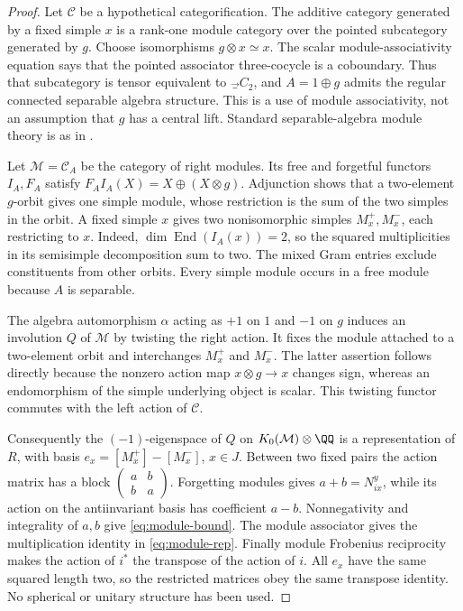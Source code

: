 \begin{proof}
Let $\mathcal C$ be a hypothetical categorification. The additive category
generated by a fixed simple $x$ is a rank-one module category over the
pointed subcategory generated by $g$. Choose isomorphisms $g\otimes x\simeq x$.
The scalar module-associativity equation says that the pointed associator
three-cocycle is a coboundary. Thus that subcategory is tensor equivalent
to $\Vec_{C_2}$, and $A=1\oplus g$ admits the regular connected separable
algebra structure. This is a use of module associativity, not an assumption
that $g$ has a central lift. Standard separable-algebra module theory is
as in \cite[Chapter~7]{EGNO}.

Let $\mathcal M=\mathcal C_A$ be the category of right modules. Its free
and forgetful functors $I_A,F_A$ satisfy
$F_AI_A(X)=X\oplus(X\otimes g)$. Adjunction shows that a two-element
$g$-orbit gives one simple module, whose restriction is the sum of the two
simples in the orbit. A fixed simple $x$ gives two nonisomorphic simples
$M_x^+,M_x^-$, each restricting to $x$. Indeed,
$\dim\operatorname{End}(I_A(x))=2$, so the squared multiplicities in its
semisimple decomposition sum to two. The mixed Gram entries exclude
constituents from other orbits. Every simple module occurs in a free
module because $A$ is separable.

The algebra automorphism $\alpha$ acting as $+1$ on $1$ and $-1$ on $g$
induces an involution $Q$ of $\mathcal M$ by twisting the right action.
It fixes the module attached to a two-element orbit and interchanges
$M_x^+$ and $M_x^-$. The latter assertion follows directly because the
nonzero action map $x\otimes g\to x$ changes sign, whereas an
endomorphism of the simple underlying object is scalar. This twisting
functor commutes with the left action of $\mathcal C$.

Consequently the $(-1)$-eigenspace of $Q$ on $K_0(\mathcal M)\otimes\QQ$
is a representation of $R$, with basis
$e_x=[M_x^+]-[M_x^-]$, $x\in J$. Between two fixed pairs the action matrix
has a block $\left(\begin{smallmatrix}a&b\\b&a\end{smallmatrix}\right)$.
Forgetting modules gives $a+b=N_{ix}^{y}$, while its action on the
antiinvariant basis has coefficient $a-b$. Nonnegativity and integrality
of $a,b$ give \eqref{eq:module-bound}. The module associator gives the
multiplication identity in \eqref{eq:module-rep}. Finally module
Frobenius reciprocity makes the action of $i^*$ the transpose of the
action of $i$. All $e_x$ have the same squared length two, so the
restricted matrices obey the same transpose identity. No spherical or
unitary structure has been used.
\end{proof}

